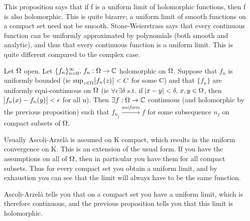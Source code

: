 \begin{note}
This proposition says that if f is a uniform limit of holomorphic functions, then f is also holomorphic. This is quite bizarre; a uniform limit of smooth functions on a compact set need not be smooth. Stone-Weierstrass says that every continuous function can be uniformly approximated by polynomials (both smooth and analytic), and thus that every continuous function is a uniform limit. This is quite different compared to the complex case.
\end{note}



\begin{theorem}
Let $\Omega$ open. Let $\{f_n \}_{n=0}^\infty, \, f_n : \Omega \to \mathbb{C}$ holomorphic on $\Omega$. Suppose that $f_n$ is uniformly bounded (ie $\sup_{z\in \Omega} \abs{f_n(z)} < C$ for some C) and that $\{f_n\}$ are uniformly equi-continuous on $\Omega$ (ie $\forall \epsilon \exists \delta$ s.t. if $\abs{x-y} < \delta, \, x,y \in \Omega$, then $\abs{f_n(x) - f_n(y)} < \epsilon$ for all n). Then $\exists f:\Omega \rightarrow \mathbb{C}$ continuous (and holomorphic by the previous proposition) such that $f_{n_j} \xrightarrow[]{uniform} f$ for some subsequence $n_j$ on compact subsets of $\Omega$.

\end{theorem}
 
\begin{note}
Usually Ascoli-Arzelà is assumed on K compact, which results in the uniform convergence on K. This is an extension of the usual form. If you have the assumptions on all of $\Omega$, then in particular you have them for all compact subsets. Thus for every compact set you obtain a uniform limit, and by exhaustion you can see that the limit will always have to be the same function.

Ascoli-Arzelà tells you that on a compact set you have a uniform limit, which is therefore continuous, and the previous proposition tells you that this limit is holomorphic.
 \end{note}